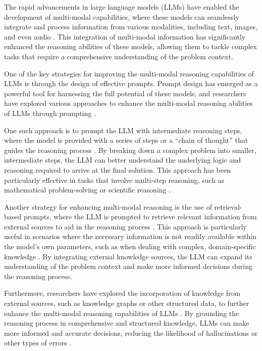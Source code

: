 \documentclass[11pt]{article}
\begin{document}
The rapid advancements in large language models (LLMs) have enabled the development of multi-modal capabilities, where these models can seamlessly integrate and process information from various modalities, including text, images, and even audio \cite{ref94}. This integration of multi-modal information has significantly enhanced the reasoning abilities of these models, allowing them to tackle complex tasks that require a comprehensive understanding of the problem context.

One of the key strategies for improving the multi-modal reasoning capabilities of LLMs is through the design of effective prompts. Prompt design has emerged as a powerful tool for harnessing the full potential of these models, and researchers have explored various approaches to enhance the multi-modal reasoning abilities of LLMs through prompting \cite{ref94,ref145}.

One such approach is to prompt the LLM with intermediate reasoning steps, where the model is provided with a series of steps or a ``chain of thought'' that guides the reasoning process \cite{ref290,ref94}. By breaking down a complex problem into smaller, intermediate steps, the LLM can better understand the underlying logic and reasoning required to arrive at the final solution. This approach has been particularly effective in tasks that involve multi-step reasoning, such as mathematical problem-solving or scientific reasoning \cite{ref145,ref96}.

Another strategy for enhancing multi-modal reasoning is the use of retrieval-based prompts, where the LLM is prompted to retrieve relevant information from external sources to aid in the reasoning process \cite{ref99}. This approach is particularly useful in scenarios where the necessary information is not readily available within the model's own parameters, such as when dealing with complex, domain-specific knowledge \cite{ref291}. By integrating external knowledge sources, the LLM can expand its understanding of the problem context and make more informed decisions during the reasoning process.

Furthermore, researchers have explored the incorporation of knowledge from external sources, such as knowledge graphs or other structured data, to further enhance the multi-modal reasoning capabilities of LLMs \cite{ref96}. By grounding the reasoning process in comprehensive and structured knowledge, LLMs can make more informed and accurate decisions, reducing the likelihood of hallucinations or other types of errors \cite{ref292}.
\end{document}
